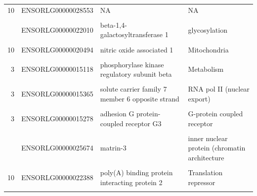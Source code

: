 \documentclass[
]{book}
\begin{document}
\begin{landscape}
\begin{table}
{\begin{tabular}[t]{rlll}
10 & ENSORLG00000028553 & NA & NA\\
\cellcolor{gray!6}{3} & \cellcolor{gray!6}{ENSORLG00000015460} & \cellcolor{gray!6}{dpy-19 like C-mannosyltransferase 3} & \cellcolor{gray!6}{glycosylation}\\
\addlinespace
10 & ENSORLG00000022010 & beta-1,4-galactosyltransferase 1 & glycosylation\\
\cellcolor{gray!6}{10} & \cellcolor{gray!6}{ENSORLG00000020498} & \cellcolor{gray!6}{protein NipSnap homolog 3A} & \cellcolor{gray!6}{Mitochondria}\\
10 & ENSORLG00000020494 & nitric oxide associated 1 & Mitochondria\\
\cellcolor{gray!6}{10} & \cellcolor{gray!6}{ENSORLG00000020504} & \cellcolor{gray!6}{ATP-binding cassette sub-family A member 1} & \cellcolor{gray!6}{Metabolism (cholestrol efflux)}\\
3 & ENSORLG00000015118 & phosphorylase kinase regulatory subunit beta & Metabolism\\
\addlinespace
\cellcolor{gray!6}{10} & \cellcolor{gray!6}{ENSORLG00000020493} & \cellcolor{gray!6}{RE1 silencing transcription factor} & \cellcolor{gray!6}{RNA pol II (transcritpion regulation}\\
3 & ENSORLG00000015365 & solute carrier family 7 member 6 opposite strand & RNA pol II (nuclear export)\\
\cellcolor{gray!6}{10} & \cellcolor{gray!6}{ENSORLG00000029052} & \cellcolor{gray!6}{exosome component 3} & \cellcolor{gray!6}{rRNA + RNA binding}\\
3 & ENSORLG00000015278 & adhesion G protein-coupled receptor G3 & G-protein coupled receptor\\
\cellcolor{gray!6}{3} & \cellcolor{gray!6}{ENSORLG00000015287} & \cellcolor{gray!6}{adhesion G-protein coupled receptor G5} & \cellcolor{gray!6}{G-protein coupled receptor}\\
\addlinespace
10 & ENSORLG00000025674 & matrin-3 & inner nuclear protein (chromatin architecture\\
\cellcolor{gray!6}{10} & \cellcolor{gray!6}{ENSORLG00000023325} & \cellcolor{gray!6}{matrin-3} & \cellcolor{gray!6}{inner nuclear protein (chromatin architecture}\\
10 & ENSORLG00000022388 & poly(A) binding protein interacting protein 2 & Translation repressor\\
\cellcolor{gray!6}{3} & \cellcolor{gray!6}{ENSORLG00000015096} & \cellcolor{gray!6}{integrin alpha FG-GAP repeat containing 1} & \cellcolor{gray!6}{NA possibly T cell activation}\\
\bottomrule
\end{tabular}}
\end{table}
\end{landscape}
\end{document}
